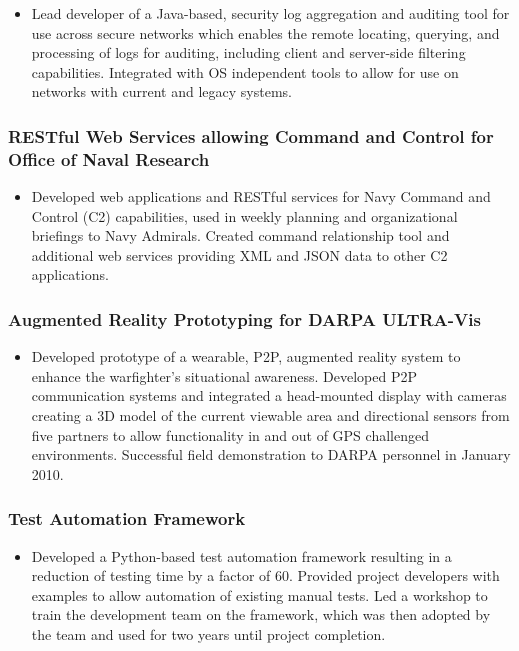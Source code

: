 \documentclass[11pt]{article}
\begin{document}
\begin{itemize}
\item Lead developer of a Java-based, security log aggregation and auditing tool for use across secure networks which enables the remote locating, querying, and processing of logs for auditing, including client and server-side filtering capabilities. Integrated with OS independent tools to allow for use on networks with current and legacy systems.
\end{itemize}
\subsubsection*{RESTful Web Services allowing Command and Control for Office of Naval Research}
\label{sec-1.2.3}

\begin{itemize}
\item Developed web applications and RESTful services for Navy Command and Control (C2) capabilities, used in weekly planning and organizational briefings to Navy Admirals. Created command relationship tool and additional web services providing XML and JSON data to other C2 applications.
\end{itemize}
\subsubsection*{Augmented Reality Prototyping for DARPA ULTRA-Vis}
\label{sec-1.2.4}

\begin{itemize}
\item Developed prototype of a wearable, P2P, augmented reality system to enhance the warfighter's situational awareness. Developed P2P communication systems and integrated a head-mounted display with cameras creating a 3D model of the current viewable area and directional sensors from five partners to allow functionality in and out of GPS challenged environments. Successful field demonstration to DARPA personnel in January 2010.
\end{itemize}
\subsubsection*{Test Automation Framework}
\label{sec-1.2.5}

\begin{itemize}
\item Developed a Python-based test automation framework resulting in a reduction of testing time by a factor of 60. Provided project developers with examples to allow automation of existing manual tests. Led a workshop to train the development team on the framework, which was then adopted by the team and used for two years until project completion.
\end{itemize}
\end{document}
